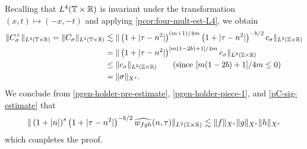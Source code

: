 %
%
Recalling that $L^4(\mathbb{T} \times \mathbb{R})$ is invariant under the transformation $(x, 
t) \mapsto (-x,-t)$ and applying 
\cref{pcor:four-mult-est-L4}, we obtain
%
%
\begin{equation}
  \label{pC-sig-estimate}
  \begin{split}
    \| C^+_\sigma \|_{L^4(\mathbb{T} \times \mathbb{R})} = \|C_\sigma \|_{L^4(\mathbb{T} \times \mathbb{R})} 
    & \lesssim \|\left( 1 + | \tau - n^{2} | 
    \right)^{(m +1)/4m} \left( 1 + | \tau - n^{2} | 
    \right)^{-b/2} c_\sigma \|_{L^2(\mathbb{Z} \times \mathbb{R})}
    \\
    & = \|\left( 1 + | \tau - n^{2} | 
    \right)^{[m(1 - 2b) + 1]/4m } c_\sigma \|_{L^2(\mathbb{Z} \times \mathbb{R})}
    \\
    & \le \|c_\sigma \|_{L^2(\mathbb{Z} \times \mathbb{R})}  \qquad (\text{since  } [m(1 - 2b) + 
    1]/4m \le 0 )
    \\
    & = \|\sigma\|_{X^s}.
  \end{split}
\end{equation}
%
%
We conclude from \eqref{pgen-holder-pre-estimate}, \eqref{pgen-holder-piece-1}, 
and \eqref{pC-sig-estimate} that
%
%
%
%
\begin{equation*}
  \begin{split}
    \| \left( 1 + |n | \right)^s \left( 1 + | \tau - n^{2} | \right)^{-b/2} \widehat{{w}_{fgh}} 
    (n, \tau) \|_{L^2(\mathbb{Z} \times \mathbb{R})} \lesssim 
    \|f\|_{X^s}\|g\|_{X^s}\|h\|_{X^s} 
  \end{split}
\end{equation*}
which completes the proof. \qquad \qedsymbol
%
%
%
%
%
%
%
